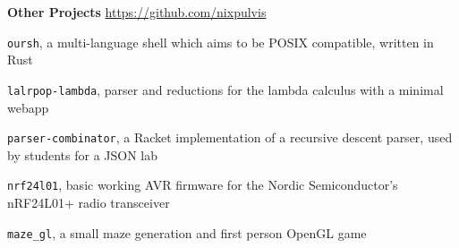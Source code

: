 \item
\headerrow
{\textbf{Other Projects}}
{\url{https://github.com/nixpulvis}}
\begin{itemize*}
    \item \texttt{oursh}, a multi-language shell which aims to be POSIX
    compatible, written in Rust
    \item \texttt{lalrpop-lambda}, parser and reductions for the lambda
    calculus with a minimal webapp
    \item \texttt{parser-combinator}, a Racket implementation of a recursive
    descent parser, used by students for a JSON lab
    \item \texttt{nrf24l01}, basic working AVR firmware for the Nordic
    Semiconductor's nRF24L01+ radio transceiver
    \item \texttt{maze\_gl}, a small maze generation and first person OpenGL game
\end{itemize*}
